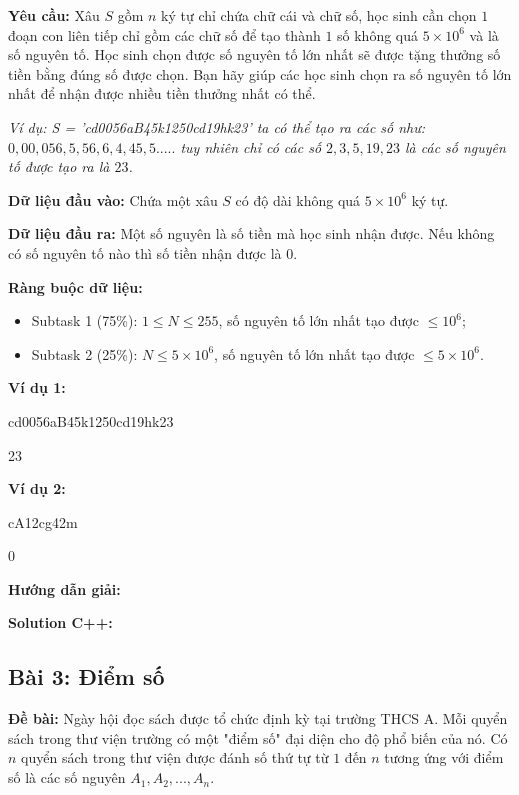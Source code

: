 \documentclass[12pt]{scrartcl}  %
\begin{document}
\textbf{Yêu cầu:}
Xâu $S$ gồm $n$ ký tự chỉ chứa chữ cái và chữ số, học sinh cần chọn $1$ đoạn con liên tiếp chỉ gồm các chữ số để tạo
thành $1$ số không quá $5 \times 10^6$ và là số nguyên tố. Học sinh chọn được số nguyên tố lớn nhất sẽ được tặng thưởng
số tiền bằng đúng số được chọn. Bạn hãy giúp các học sinh chọn ra số nguyên tố lớn nhất để nhận được nhiều tiền thưởng nhất có thể.

\textit{Ví dụ: S = 'cd0056aB45k1250cd19hk23' ta có thể tạo ra các số như: $0, 00, 056, 5, 56, 6, 4, 45, 5.....$ tuy nhiên chỉ có các số $2, 3, 5, 19, 23$ là các số nguyên tố được tạo ra là $23$.}

\textbf{Dữ liệu đầu vào:}
Chứa một xâu $S$ có độ dài không quá $5 \times 10^6$ ký tự.

\textbf{Dữ liệu đầu ra:}
Một số nguyên là số tiền mà học sinh nhận được.
Nếu không có số nguyên tố nào thì số tiền nhận được là 0.

\textbf{Ràng buộc dữ liệu:}
\begin{itemize}
    \item Subtask 1 (75\%): $1 \leq N \leq 255$, số nguyên tố lớn nhất tạo được $\leq 10^6$;
    \item Subtask 2 (25\%): $N \leq 5 \times 10^6$, số nguyên tố lớn nhất tạo được $\leq 5 \times 10^6$.
\end{itemize}

\textbf{Ví dụ 1:}
\begin{tcolorbox}[colback=gray!5!white, colframe=blue!50!black, title=Input]
cd0056aB45k1250cd19hk23
\end{tcolorbox}
\begin{tcolorbox}[colback=gray!5!white, colframe=green!50!black, title=Output]
23
\end{tcolorbox}

\textbf{Ví dụ 2:}
\begin{tcolorbox}[colback=gray!5!white, colframe=blue!50!black, title=Input]
cA12cg42m
\end{tcolorbox}
\begin{tcolorbox}[colback=gray!5!white, colframe=green!50!black, title=Output]
0
\end{tcolorbox}

\textbf{Hướng dẫn giải:}

\textbf{Solution C++:}

\subsection{Bài 3: Điểm số}
\textbf{Đề bài:}
Ngày hội đọc sách được tổ chức định kỳ tại trường THCS A. Mỗi quyển sách trong thư viện trường có một "điểm số" đại diện cho độ phổ biến của nó. Có $n$ quyển sách trong thư viện được đánh số thứ tự từ $1$ đến $n$ tương ứng với điểm số là các số nguyên $A_1, A_2, ... , A_n$.
\end{document}
